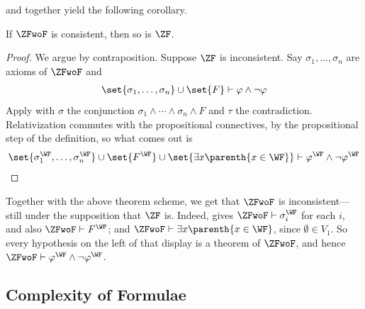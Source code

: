  and  together yield the following corollary.

\begin{boxcorollary}
    If $\ZFwoF$ is consistent, then so is $\ZF$.
\end{boxcorollary}
\begin{proof}
    We argue by contraposition. Suppose $\ZF$ is inconsistent. Say $\sigma_1, \ldots, \sigma_n$ are axioms of $\ZFwoF$ and
    \begin{align*}
        \set{\sigma_1, \ldots, \sigma_n} \cup \set{F} \vdash \varphi \land \neg\varphi
    \end{align*}
    Apply  with $\sigma$ the conjunction $\sigma_1 \land \cdots \land \sigma_n \land F$ and $\tau$ the contradiction. Relativization commutes with the propositional connectives, by the propositional step of the definition, so what comes out is
    \begin{align*}
        \set{\sigma_1^{\WF}, \ldots, \sigma_n^{\WF}} \cup \set{F^{\WF}} \cup \set{\exists x \parenth{x \in \WF}} \vdash \varphi^{\WF} \land \neg \varphi^{\WF}
    \end{align*}
\end{proof}

Together with the above theorem scheme, we get that $\ZFwoF$ is inconsistent---still under the supposition that $\ZF$ is. Indeed,  gives $\ZFwoF \vdash \sigma_i^{\WF}$ for each $i$, and also $\ZFwoF \vdash F^{\WF}$; and $\ZFwoF \vdash \exists x \parenth{x \in \WF}$, since $\emptyset \in V_1$. So every hypothesis on the left of that display is a theorem of $\ZFwoF$, and hence $\ZFwoF \vdash \varphi^{\WF} \land \neg\varphi^{\WF}$.

\subsection{Complexity of Formulae}

